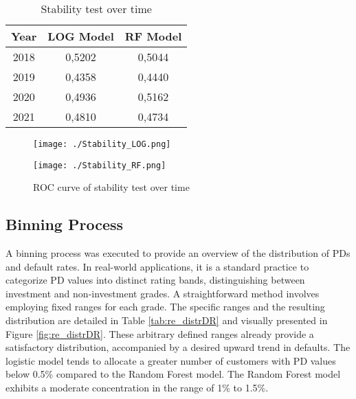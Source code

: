 \begin{table}[H]
\centering
\begin{tabular}{ccc}\toprule
\textbf{Year} & \textbf{LOG Model} & \textbf{RF Model} \\\midrule
2018          & 0,5202             & 0,5044            \\
2019          & 0,4358             & 0,4440            \\
2020          & 0,4936             & 0,5162            \\
2021          & 0,4810             & 0,4734        	\\\bottomrule   
\end{tabular}
\caption{Stability test over time}
\label{tab:re_stab}
\end{table}

\begin{figure}[H]
\begin{minipage}{.5\textwidth}
	\centering
	\texttt{[image: ./Stability\_LOG.png]}
\end{minipage}%
\begin{minipage}{.5\textwidth}
	\centering
	\texttt{[image: ./Stability\_RF.png]}
\end{minipage}
    \caption{ROC curve of stability test over time}
    \label{fig:re_rocstab}
\end{figure}

\subsection{Binning Process}
A binning process was executed to provide an overview of the distribution of PDs and default rates. In real-world applications, it is a standard practice to categorize PD values into distinct rating bands, distinguishing between investment and non-investment grades. A straightforward method involves employing fixed ranges for each grade. The specific ranges and the resulting distribution are detailed in Table \ref{tab:re_distrDR} and visually presented in Figure \ref{fig:re_distrDR}. These arbitrary defined ranges already provide a satisfactory distribution, accompanied by a desired upward trend in defaults. The logistic model tends to allocate a greater number of customers with PD values below 0.5\% compared to the Random Forest model. The Random Forest model exhibits a moderate concentration in the range of 1\% to 1.5\%.

